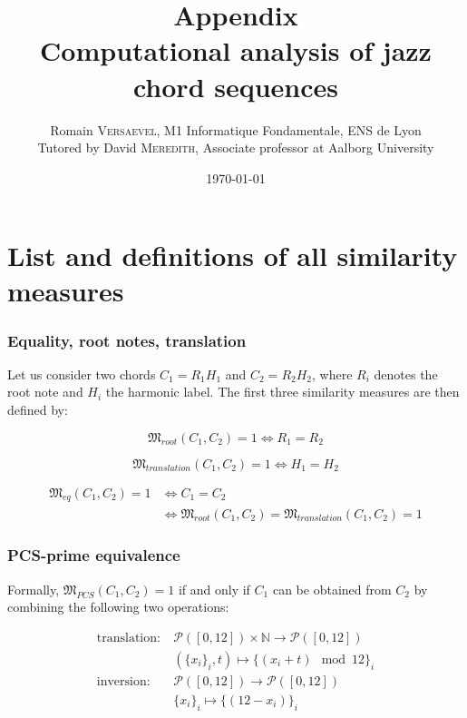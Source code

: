 \documentclass[a4paper,10pt]{article}
\title{ \Large Appendix \\ \LARGE Computational analysis of jazz chord sequences}
\author{\normalsize Romain \textsc{Versaevel}, M1 Informatique Fondamentale, ENS de Lyon \\ \normalsize Tutored by David \textsc{Meredith}, Associate professor at Aalborg University\\}
\date{\today}
\begin{document}
\maketitle
\tableofcontents
\newpage


\section{List and definitions of all similarity measures}

\subsubsection*{Equality, root notes, translation}

Let us consider two chords $C_1 = R_1 H_1$ and $C_2 = R_2 H_2$, where $R_i$ denotes the root note and $H_i$ the harmonic label.
The first three similarity measures are then defined by:

\begin{equation*}
\mathfrak{M}_{root}(C_1,C_2) = 1 \Leftrightarrow R_1 = R_2
\end{equation*}

\begin{equation*}
\mathfrak{M}_{translation}(C_1,C_2) = 1 \Leftrightarrow H_1 = H_2
\end{equation*}

\begin{align*}
\mathfrak{M}_{eq}(C_1,C_2) = 1 & \Leftrightarrow C_1 = C_2 \\
& \Leftrightarrow \mathfrak{M}_{root}(C_1,C_2) = \mathfrak{M}_{translation}(C_1,C_2) = 1
\end{align*}


\subsubsection*{PCS-prime equivalence}

Formally, $\mathfrak{M}_{PCS}(C_1,C_2) = 1$ if and only if $C_1$ can be obtained from $C_2$ by combining the following two operations:

\begin{align*}
\text{translation} :~& \mathcal{P}([0,12])\times\mathbb{N} \longrightarrow \mathcal{P}([0,12]) \\
 & (\{x_i\}_i, t) \longmapsto \{(x_i+t)\mod 12\}_i \\
\text{inversion} :~& \mathcal{P}([0,12]) \longrightarrow \mathcal{P}([0,12]) \\
 & \{x_i\}_i \longmapsto \{(12-x_i)\}_i
\end{align*}
\end{document}
